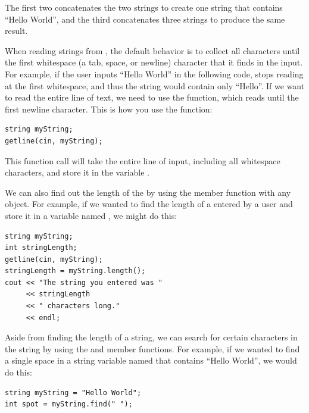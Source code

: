 \noindent The first two concatenates the two strings to create one string that contains ``Hello World'', and the third concatenates three strings to produce the same result.

When reading strings from , the default behavior is to collect all characters until the first whitespace (a tab, space, or newline) character that it finds in the input.
For example, if the user inputs ``Hello World'' in the following code,  stops reading at the first whitespace, and thus the string would contain only ``Hello''.
If we want to read the entire line of text, we need to use the  function, which reads until the first newline character.
This is how you use the  function:

\noindent\begin{minipage}{\linewidth}\begin{lstlisting}
string myString;
getline(cin, myString);
\end{lstlisting}\end{minipage}

\noindent This function call will take the entire line of input, including all whitespace characters, and store it in the variable . 
		
We can also find out the length of the  by using the member function  with any  object.
For example, if we wanted to find the length of a  entered by a user and store it in a variable named , we might do this:

\noindent\begin{minipage}{\linewidth}\begin{lstlisting}
string myString;
int stringLength;
getline(cin, myString);
stringLength = myString.length();
cout << "The string you entered was "
     << stringLength
     << " characters long."
     << endl;
\end{lstlisting}\end{minipage}

\noindent Aside from finding the length of a string, we can search for certain characters in the string by using the  and  member functions.
For example, if we wanted to find a single space in a string variable named  that contains ``Hello World'', we would do this:

\noindent\begin{minipage}{\linewidth}\begin{lstlisting}
string myString = "Hello World";
int spot = myString.find(" ");
\end{lstlisting}\end{minipage}

